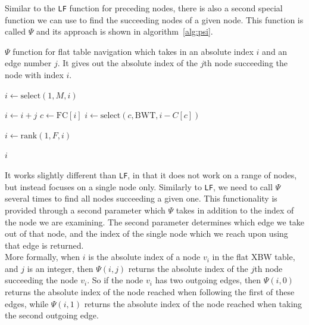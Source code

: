 \documentclass[a4paper,12pt,twoside,BCOR=10mm]{scrbook}
\begin{document}
Similar to the \texttt{LF} function for preceding nodes, there is also a second special function we can use
to find the succeeding nodes of a given node.
This function is called $ \Psi $ and its approach is shown in algorithm~\ref{alg:psi}.
\begin{algorithm}
\caption[$ \Psi $ function for flat table navigation]{$ \Psi $ function for flat table navigation which takes in an absolute index $ i $ and an edge number $ j $. It gives out the absolute index of the $ j $th node succeeding the node with index $ i $.}
\label{alg:psi}
\begin{algorithmic}[1]

\State $ i \gets \textrm{select}(1, M, i) $

\State \phantom{nl}

\State $ i \gets i + j $
\State $ c \gets \textrm{FC} [ i ] $
\State $ i \gets \textrm{select}(c, \textrm{BWT}, i - C [ c ]) $

\State \phantom{nl}

\State $ i \gets \textrm{rank}(1, F, i) $

\State \phantom{nl}

\State \Return $ i $

\end{algorithmic}
\end{algorithm}
It works slightly different than \texttt{LF},
in that it does not work on a range of nodes, but instead focuses on a single node only.
Similarly to \texttt{LF}, we need to call $ \Psi $ several times to find all nodes succeeding a given one.
This functionality is provided through a second parameter which $ \Psi $ takes
in addition to the index of the node we are examining.
The second parameter determines which edge we take out of that node,
and the index of the single node which we reach upon using that edge is returned. \\
More formally, when $ i $ is the absolute index of a node $ v_i $ in the flat XBW table,
and $ j $ is an integer, then $ \Psi (i, j) $ returns the absolute index of the $ j $th node
succeeding the node $ v_i $. So if the node $ v_i $ has two outgoing edges,
then $ \Psi (i, 0) $ returns the absolute index of the node reached when following
the first of these edges, while $ \Psi (i, 1) $ returns the absolute index of the node reached when
taking the second outgoing edge. \\
\end{document}
